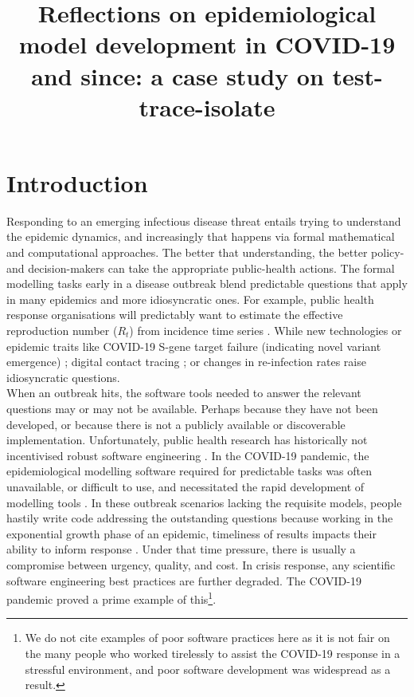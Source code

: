 \documentclass[12pt, letterpaper]{article}
\title{Reflections on epidemiological model development in COVID-19 and since: a case study on test-trace-isolate}
\begin{document}
\maketitle

\section*{Introduction}

Responding to an emerging infectious disease threat entails trying to understand the epidemic dynamics, and increasingly that happens via formal mathematical and computational approaches. The better that understanding, the better policy- and decision-makers can take the appropriate public-health actions. The formal modelling tasks early in a disease outbreak blend predictable questions that apply in many epidemics and more idiosyncratic ones. For example, public health response organisations will predictably want to estimate the effective reproduction number ($R_t$) from incidence time series \citep{Cori2013}. While new technologies or epidemic traits like COVID-19 S-gene target failure (indicating novel variant emergence) \citep{Davies2021, Clark2022}; digital contact tracing \citep{Wymant2021}; or changes in re-infection rates \citep{Pulliam2022} raise idiosyncratic questions. \\

When an outbreak hits, the software tools needed to answer the relevant questions may or may not be available. Perhaps because they have not been developed, or because there is not a publicly available or discoverable implementation. Unfortunately, public health research has historically not incentivised robust software engineering \citep{Kucharski2020}. In the COVID-19 pandemic, the epidemiological modelling software required for predictable tasks was often unavailable, or difficult to use, and necessitated the rapid development of modelling tools \citep{BrooksPollock2021, Jombart2021, Lais2024}. In these outbreak scenarios lacking the requisite models, people hastily write code addressing the outstanding questions because working in the exponential growth phase of an epidemic, timeliness of results impacts their ability to inform response \citep{Whitty2015}. Under that time pressure, there is usually a compromise between urgency, quality, and cost. In crisis response, any scientific software engineering best practices are further degraded. The COVID-19 pandemic proved a prime example of this\footnote{We do not cite examples of poor software practices here as it is not fair on the many people who worked tirelessly to assist the COVID-19 response in a stressful environment, and poor software development was widespread as a result.}. \\
\end{document}
